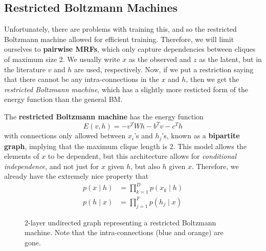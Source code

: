 \documentclass{article}
\begin{document}
\subsection{Restricted Boltzmann Machines} 

  Unfortunately, there are problems with training this, and so the restricted Boltzmann machine allowed for efficient training. Therefore, we will limit ourselves to \textbf{pairwise MRFs}, which only capture dependencies between cliques of maximum size $2$. We usually write $x$ as the observed and $z$ as the latent, but in the literature $v$ and $h$ are used, respectively. Now, if we put a restriction saying that there cannot be any intra-connections in the $x$ and $h$, then we get the \textit{restricted Boltzmann machine}, which has a slightly more resticted form of the energy function than the general BM. 

  \begin{definition} 
    The \textbf{restricted Boltzmann machine} has the energy function 
    \begin{equation}
      E(v, h) = - v^T W h - b^T v - c^T h
    \end{equation}
    with connections only allowed between $x_i$'s and $h_j$'s, known as a \textbf{bipartite graph}, implying that the maximum clique length is $2$. This model allows the elements of $x$ to be dependent, but this architecture allows for \textit{conditional independence}, and not just for $x$ given $h$, but also $h$ given $x$. Therefore, we already have the extremely nice property that 
    \begin{align} 
      p(x \mid h) & = \prod_{k=1}^{D} p(x_k \mid h) \\
      p(h \mid x) & = \prod_{j=1}^F p(h_j \mid x) 
    \end{align}

    \begin{figure}[H]
      \centering 
      \caption{2-layer undirected graph representing a restricted Boltzmann machine. Note that the intra-connections (blue and orange) are gone. } 
      \label{fig:rbm}
    \end{figure}
  \end{definition}
\end{document}
